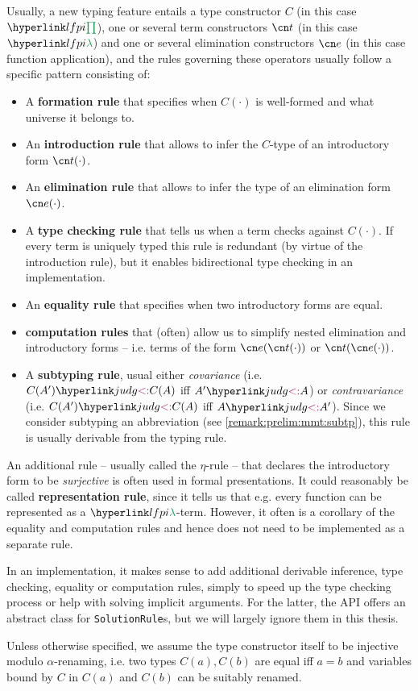 \begin{remark}\label{remark:prelim:lf:pattern}
Usually, a new typing feature entails a type constructor $C$ (in this case $\lfpisym$), one or several term constructors $\cn t$ (in this case $\lflambdasym$) and one or several elimination constructors $\cn e$ (in this case function application), and the rules governing these operators usually follow a specific pattern consisting of:
\begin{itemize}
	\item A \textbf{formation rule} that specifies when $C(\cdot)$ is well-formed and what universe it belongs to.
	\item An \textbf{introduction rule} that allows to infer the $C$-type of an introductory form $\cn t(\cdot)$.
	\item An \textbf{elimination rule} that allows to infer the type of an elimination form $\cn e(\cdot)$.
	\item A \textbf{type checking rule} that tells us when a term checks against $C(\cdot)$. If every term is uniquely typed this rule
		is redundant (by virtue of the introduction rule), but it enables bidirectional type checking in an implementation.
	\item An \textbf{equality rule} that specifies when two introductory forms are equal.
	\item \textbf{computation rules} that (often) allow us to simplify nested elimination and introductory forms -- i.e. terms of the
		form $\cn e(\cn t(\cdot))$ or $\cn t(\cn e(\cdot))$.
	\item A \textbf{subtyping rule}, usual either \emph{covariance} (i.e. $\subtp{C(A')}{C(A)}$ iff $\subtp{A'}A$) or \emph{contravariance} (i.e. $\subtp{C(A')}{C(A)}$ iff $\subtp A{A'}$). Since we consider subtyping an abbreviation (see \autoref{remark:prelim:mmt:subtp}), this rule is usually derivable from the typing rule.
\end{itemize}
An additional rule -- usually called the $\eta$-rule -- that declares the introductory form to be \emph{surjective} is often used in formal presentations. It could reasonably be called \textbf{representation rule}, since it tells us that e.g. every function can be represented as a $\lflambdasym$-term. However, it often is a corollary of the equality and computation rules and hence does not need to be implemented as a separate rule.

In an implementation, it makes sense to add additional derivable inference, type checking, equality or computation rules, simply to speed up the type checking process or help with solving implicit arguments. For the latter, the \mmt API offers an abstract class for \lstinline[language=scala]|SolutionRule|s, but we will largely ignore them in this thesis.

Unless otherwise specified, we assume the type constructor itself to be injective modulo $\alpha$-renaming, i.e. two types $C(a),C(b)$ are equal iff $a=b$ and variables bound by $C$ in $C(a)$ and $C(b)$ can be suitably renamed.
\end{remark}

